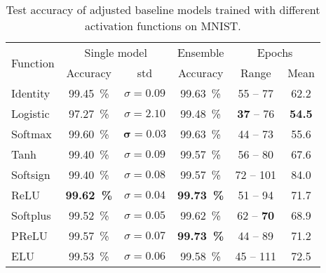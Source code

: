 \begin{table}[H]
    \centering
    \begin{tabular}{lccccc}
    \toprule
    \multirow{2}{*}{Function} & \multicolumn{2}{c}{Single model}              & Ensemble & \multicolumn{2}{c}{Epochs}\\\cline{2-3}\cline{5-6}
                              & Accuracy             & std                    & Accuracy & Range & Mean \\\midrule
    Identity                  & \SI{99.45}{\percent} & $\sigma=0.09$          & \SI{99.63}{\percent} & 55 -- \hphantom{0}77  & 62.2\\%
    Logistic                  & \SI{97.27}{\percent} & $\sigma=2.10$          & \SI{99.48}{\percent} & \textbf{37} -- \hphantom{0}76  & \textbf{54.5}\\
    Softmax                   & \SI{99.60}{\percent} & $\boldsymbol{\sigma=0.03}$& \SI{99.63}{\percent} & 44 -- \hphantom{0}73  & 55.6\\
    Tanh                      & \SI{99.40}{\percent} & $\sigma=0.09$          & \SI{99.57}{\percent} & 56 -- \hphantom{0}80  & 67.6\\
    Softsign                  & \SI{99.40}{\percent} & $\sigma=0.08$          & \SI{99.57}{\percent} & 72 -- 101             & 84.0\\
    \gls{ReLU}                & \textbf{\SI{99.62}{\percent}} & \textbf{$\sigma=0.04$} & \textbf{\SI{99.73}{\percent}} & 51 -- \hphantom{0}94 & 71.7\\
    Softplus                  & \SI{99.52}{\percent} & $\sigma=0.05$          & \SI{99.62}{\percent} & 62 -- \hphantom{0}\textbf{70}  & 68.9\\
    \gls{PReLU}               & \SI{99.57}{\percent} & $\sigma=0.07$          & \textbf{\SI{99.73}{\percent}} & 44 -- \hphantom{0}89 & 71.2\\
    \gls{ELU}                 & \SI{99.53}{\percent} & $\sigma=0.06$          & \SI{99.58}{\percent} & 45 -- 111 & 72.5\\
    \bottomrule
    \end{tabular}
    \caption[Activation function evaluation results on MNIST]{Test accuracy of
             adjusted baseline models trained with different activation
             functions on MNIST.}
    \label{table:MNIST-accuracies-activation-functions}
\end{table}

